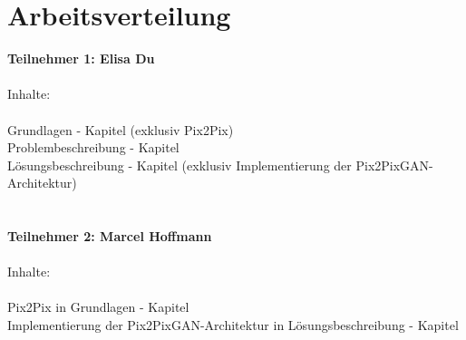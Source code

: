 \chapter*{Arbeitsverteilung}

\textbf{Teilnehmer 1:  Elisa Du} \\
\\
 Inhalte: \\
\\ Grundlagen - Kapitel (exklusiv Pix2Pix)
\\ Problembeschreibung - Kapitel
\\ Lösungsbeschreibung - Kapitel (exklusiv Implementierung der Pix2PixGAN-Architektur)
\\
\\
\\
\textbf{Teilnehmer 2: Marcel Hoffmann} \\
\\
 Inhalte: \\
\\ Pix2Pix in Grundlagen - Kapitel
\\ Implementierung der Pix2PixGAN-Architektur in Lösungsbeschreibung - Kapitel
\\
\\
\\
